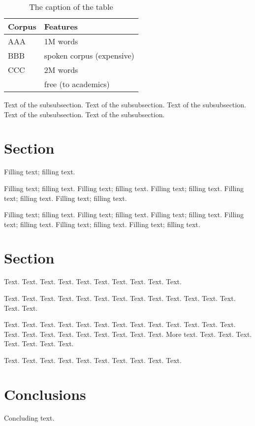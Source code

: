 \documentclass[11pt]{article}
\begin{document}
\begin{table}[h]
 \begin{center}
\begin{tabular}{|l|l|}

      \hline
      Corpus & Features\\
      \hline\hline
      AAA & 1M words\\
      BBB & spoken corpus (expensive)\\
      CCC & 2M words\\
        & free (to academics)\\
      \hline

\end{tabular}
\caption{The caption of the table}\label{table1}
 \end{center}
\end{table}


Text of the subsubsection.
Text of the subsubsection.
Text of the subsubsection.
Text of the subsubsection.
Text of the subsubsection.


\section{Section}

Filling text; filling text.

Filling text; filling text.
Filling text; filling text.
Filling text; filling text.
Filling text; filling text.
Filling text; filling text.

Filling text; filling text.
Filling text; filling text.
Filling text; filling text.
Filling text; filling text.
Filling text; filling text.
Filling text; filling text.

\section{Section}

Text. Text. Text. Text. Text.
Text. Text. Text. Text. Text.

Text. Text. Text. Text. Text.
Text. Text. Text. Text. Text.
Text. Text. Text. Text. Text.

Text. Text. Text. Text. Text.
Text. Text. Text. Text. Text.
Text. Text. Text. Text. Text.
Text. Text. Text. Text. Text.
Text. Text. More text. Text. Text.
Text. Text. Text. Text. Text.

Text. Text. Text. Text. Text.
Text. Text. Text. Text. Text.

\section{Conclusions}

Concluding text.
\nocite{*}


\end{document}
